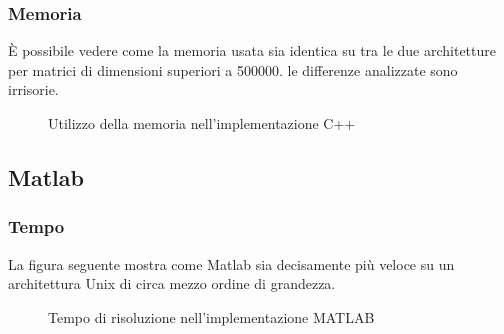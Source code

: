 \documentclass[11pt,italian]{article}
\begin{document}
\subsubsection*{Memoria}
È possibile vedere come la memoria usata sia identica su tra le due architetture per matrici di dimensioni superiori a 500000.\newline
le differenze analizzate sono irrisorie.
\begin{figure}[H]
    \caption{Utilizzo della memoria nell'implementazione C++}
    \label{fig:cpp-memory}
\end{figure}

\subsection{Matlab}
\subsubsection*{Tempo}
La figura seguente mostra come Matlab sia decisamente più veloce su un architettura Unix di circa mezzo ordine di grandezza.
\begin{figure}[H]
    \caption{Tempo di risoluzione nell'implementazione MATLAB}
    \label{fig:matlab-time}
\end{figure}
\end{document}
